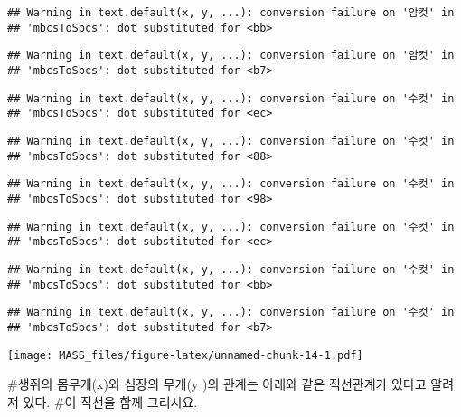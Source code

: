 \documentclass[
]{article}
\newenvironment{Shaded}{\begin{snugshade}}{\end{snugshade}}
\newcommand{\AttributeTok}[1]{\textcolor[rgb]{0.13,0.29,0.53}{#1}}
\newcommand{\DecValTok}[1]{\textcolor[rgb]{0.00,0.00,0.81}{#1}}
\newcommand{\FunctionTok}[1]{\textcolor[rgb]{0.13,0.29,0.53}{\textbf{#1}}}
\newcommand{\NormalTok}[1]{#1}
\newcommand{\SpecialCharTok}[1]{\textcolor[rgb]{0.81,0.36,0.00}{\textbf{#1}}}
\newcommand{\StringTok}[1]{\textcolor[rgb]{0.31,0.60,0.02}{#1}}
\begin{document}
\begin{verbatim}
## Warning in text.default(x, y, ...): conversion failure on '암컷' in
## 'mbcsToSbcs': dot substituted for <bb>
\end{verbatim}

\begin{verbatim}
## Warning in text.default(x, y, ...): conversion failure on '암컷' in
## 'mbcsToSbcs': dot substituted for <b7>
\end{verbatim}

\begin{verbatim}
## Warning in text.default(x, y, ...): conversion failure on '수컷' in
## 'mbcsToSbcs': dot substituted for <ec>
\end{verbatim}

\begin{verbatim}
## Warning in text.default(x, y, ...): conversion failure on '수컷' in
## 'mbcsToSbcs': dot substituted for <88>
\end{verbatim}

\begin{verbatim}
## Warning in text.default(x, y, ...): conversion failure on '수컷' in
## 'mbcsToSbcs': dot substituted for <98>
\end{verbatim}

\begin{verbatim}
## Warning in text.default(x, y, ...): conversion failure on '수컷' in
## 'mbcsToSbcs': dot substituted for <ec>
\end{verbatim}

\begin{verbatim}
## Warning in text.default(x, y, ...): conversion failure on '수컷' in
## 'mbcsToSbcs': dot substituted for <bb>
\end{verbatim}

\begin{verbatim}
## Warning in text.default(x, y, ...): conversion failure on '수컷' in
## 'mbcsToSbcs': dot substituted for <b7>
\end{verbatim}

\texttt{[image: MASS\_files/figure-latex/unnamed-chunk-14-1.pdf]}

\#생쥐의 몸무게(x)와 심장의 무게(y )의 관계는 아래와 같은 직선관계가
있다고 알려져 있다. \#이 직선을 함께 그리시요.

\begin{Shaded}
\end{Shaded}
\end{document}
